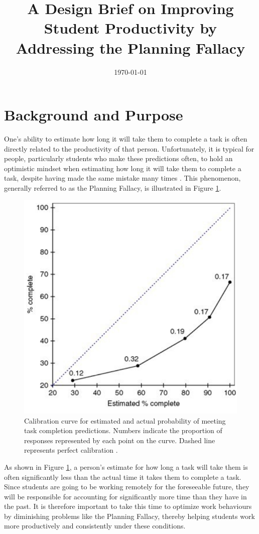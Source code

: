 \documentclass[11pt]{article}
\begin{document}
    \title{A Design Brief on Improving Student Productivity by Addressing the Planning Fallacy}
        \author{}
        \date{\today}
    \maketitle

\tableofcontents
\pagebreak
\section{Background and Purpose}
    One's ability to estimate how long it will take them to complete a task is often directly related to the productivity of that person. Unfortunately, it is typical for people, particularly students who make these predictions often, to hold an optimistic mindset when estimating how long it will take them to complete a task, despite having made the same mistake many times \cite{buehler2010planning}. This phenomenon, generally referred to as the Planning Fallacy, is illustrated in Figure \ref{fig:PlanningFallacy}. 
    
    \begin{figure}[H] 
        \centering\includegraphics[width = .4\linewidth]{Placeholder.PNG}
        \caption{Calibration curve for estimated and actual probability of meeting task completion predictions. Numbers indicate the proportion of responses represented by each point on the curve. Dashed line represents perfect calibration \cite{buehler2010planning}.}
        \label{fig:PlanningFallacy}
    \end{figure}
    
    As shown in Figure \ref{fig:PlanningFallacy}, a person's estimate for how long a task will take them is often significantly less than the actual time it takes them to complete a task. 
    Since students are going to be working remotely for the foreseeable future, they will be responsible for accounting for significantly more time than they have in the past. It is therefore important to take this time to optimize work behaviours by diminishing problems like the Planning Fallacy, thereby helping students work more productively and consistently under these conditions.
\end{document}
